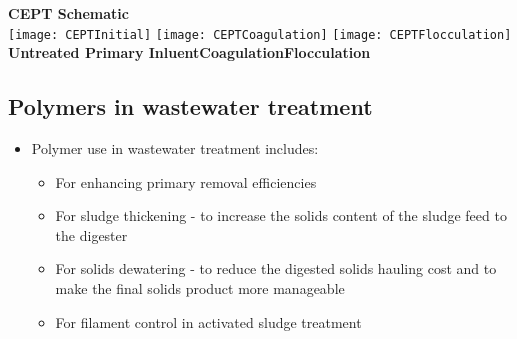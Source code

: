 \vspace{0.6cm}
\hspace{6.8 cm} \textbf{CEPT Schematic}\\
\vspace{0.6cm}
\hspace{1.5 cm}\texttt{[image: CEPTInitial]} \hspace{0.7 cm}\texttt{[image: CEPTCoagulation]}\hspace{0.7 cm}
\texttt{[image: CEPTFlocculation]}\\
\hspace{0.8 cm} \textbf{Untreated Primary Inluent}\hspace{1.6 cm}\textbf{Coagulation}\hspace{2.8 cm}\textbf{Flocculation}\\

\subsection{Polymers in wastewater treatment} 
        	\begin{itemize}
        		\item Polymer use in wastewater treatment includes:
        			\begin{itemize}
        				\item For enhancing primary removal efficiencies
        				\item For sludge thickening - to increase the solids content of the sludge feed to the digester
        				\item For solids dewatering - to reduce the digested solids hauling cost and to make the final solids product more manageable
        				\item For filament control in activated sludge treatment
        			\end{itemize}
        	\end{itemize}
  

